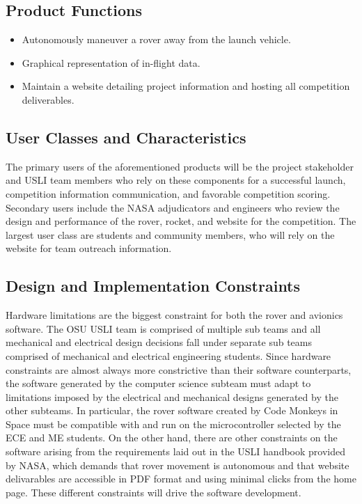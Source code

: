 \documentclass[onecolumn, draftclsnofoot, 10pt, compsoc]{IEEEtran}
\begin{document}
\subsection{Product Functions}
\begin{itemize} 
\item Autonomously maneuver a rover away from the launch vehicle. 
\item Graphical representation of in-flight data.
\item Maintain a website detailing project information and hosting all competition deliverables.
\end{itemize}

\subsection{User Classes and Characteristics}
The primary users of the aforementioned products will be the project stakeholder and USLI team members who rely on these components for a successful launch, competition information communication, and favorable competition scoring. Secondary users include the NASA adjudicators and engineers who review the design and performance of the rover, rocket, and website for the competition. The largest user class are students and community members, who will rely on the website for team outreach information.

\subsection{Design and Implementation Constraints}
Hardware limitations are the biggest constraint for both the rover and avionics software. The OSU USLI team is comprised of multiple sub teams and all mechanical and electrical design decisions fall under separate sub teams comprised of mechanical and electrical engineering students. Since hardware constraints are almost always more constrictive than their software counterparts, the software generated by the computer science subteam must adapt to limitations imposed by the electrical and mechanical designs generated by the other subteams. In particular, the rover software created by Code Monkeys in Space must be compatible with and run on the microcontroller selected by the ECE and ME students. On the other hand, there are other constraints on the software arising from the requirements laid out in the USLI handbook provided by NASA, which demands that rover movement is autonomous and that website delivarables are accessible in PDF format and using minimal clicks from the home page. These different constraints will drive the software development.
\end{document}

